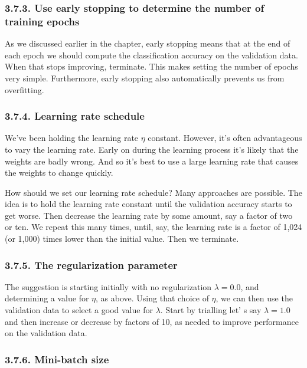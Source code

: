 \documentclass[12 pt]{article}
\begin{document}
\subsubsection{3.7.3. Use early stopping to determine the number of training epochs}
\label{use-early-stopping-to-determine-the-number-of-training-epochs}

As we discussed earlier in the chapter, early stopping means that at the
end of each epoch we should compute the classification accuracy on the
validation data. When that stops improving, terminate. This makes
setting the number of epochs very simple. Furthermore, early stopping
also automatically prevents us from overfitting.

\subsubsection{3.7.4. Learning rate schedule}
\label{learning-rate-schedule}

We've been holding the learning rate $ \eta $ constant. However, it's
often advantageous to vary the learning rate. Early on during the
learning process it's likely that the weights are badly wrong. And so
it's best to use a large learning rate that causes the weights to change
quickly.

How should we set our learning rate schedule? Many approaches are
possible. The idea is to hold the learning rate constant until the
validation accuracy starts to get worse. Then decrease the learning rate
by some amount, say a factor of two or ten. We repeat this many times,
until, say, the learning rate is a factor of 1,024 (or 1,000) times
lower than the initial value. Then we terminate.

\subsubsection{3.7.5. The regularization parameter}
\label{the-regularization-parameter}

The suggestion is starting initially with no regularization $ \lambda =
0.0 $, and determining a value for $
\eta $, as above. Using that choice of $
\eta $, we can then use the validation data to select a good value for $
\lambda $. Start by trialling let' s say $ \lambda = 1.0 $ and then
increase or decrease by factors of 10, as needed to improve performance
on the validation data.

\subsubsection{3.7.6. Mini-batch size}\label{mini-batch-size}
\end{document}
